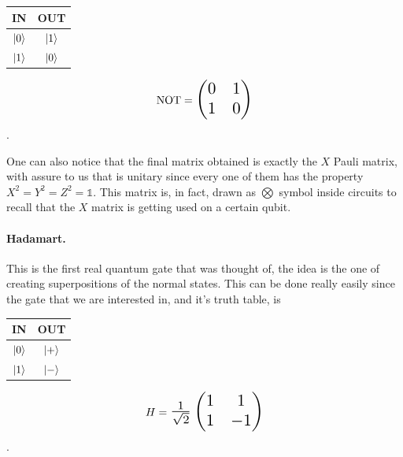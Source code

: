 \begin{minipage}{0.45\textwidth}
    \centering
    \begin{tabular}{c|c}
        \textbf{IN} & \textbf{OUT}\\
        \midrule
        $\ket{0}$ & $\ket{1}$\\
        $\ket{1}$ & $\ket{0}$
    \end{tabular}
\end{minipage}
\begin{minipage}{0.45\textwidth}
    \centering
    \begin{equation}
        \text{NOT} = \scalebox{1.5}{$\begin{pmatrix}
            0 & 1\\
            1 & 0
        \end{pmatrix}$}
    \end{equation}.
\end{minipage}

\noindent
One can also notice that the final matrix obtained is exactly the $X$ Pauli matrix, with assure to us that is unitary since every one of them has the property $X^2 = Y^2 = Z^2 = \mathbb{1}$. This matrix is, in fact, drawn as $\bigotimes$ symbol inside circuits to recall that the $X$ matrix is getting used on a certain qubit.

\paragraph{Hadamart.} This is the first real quantum gate that was thought of, the idea is the one of creating superpositions of the normal states. This can be done really easily since the gate that we are interested in, and it's truth table, is

\begin{minipage}{0.45\textwidth}
    \centering
    \begin{tabular}{c|c}
        \textbf{IN} & \textbf{OUT}\\
        \midrule
        $\ket{0}$ & $\ket{+}$\\
        $\ket{1}$ & $\ket{-}$
    \end{tabular}
\end{minipage}
\begin{minipage}{0.45\textwidth}
    \centering
    \begin{equation}
        H = \scalebox{1.5}{$\frac{1}{\sqrt{2}}\begin{pmatrix}
            1 & 1\\
            1 & -1
        \end{pmatrix}$}
    \end{equation}.
\end{minipage}

